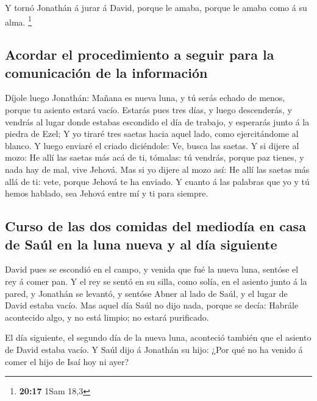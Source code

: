  Y tornó Jonathán á jurar á David, porque le amaba, porque
le amaba como á su alma. \footnote{\textbf{20:17} 1Sam 18,3}

\hypertarget{acordar-el-procedimiento-a-seguir-para-la-comunicaciuxf3n-de-la-informaciuxf3n}{%
\subsection{Acordar el procedimiento a seguir para la comunicación de la
información}\label{acordar-el-procedimiento-a-seguir-para-la-comunicaciuxf3n-de-la-informaciuxf3n}}

 Díjole luego Jonathán: Mañana es nueva luna, y tú serás
echado de menos, porque tu asiento estará vacío.  Estarás
pues tres días, y luego descenderás, y vendrás al lugar donde estabas
escondido el día de trabajo, y esperarás junto á la piedra de Ezel;
 Y yo tiraré tres saetas hacia aquel lado, como
ejercitándome al blanco.  Y luego enviaré el criado
diciéndole: Ve, busca las saetas. Y si dijere al mozo: He allí las
saetas más acá de ti, tómalas: tú vendrás, porque paz tienes, y nada hay
de mal, vive Jehová.  Mas si yo dijere al mozo así: He allí
las saetas más allá de ti: vete, porque Jehová te ha enviado.
 Y cuanto á las palabras que yo y tú hemos hablado, sea
Jehová entre mí y ti para siempre.

\hypertarget{curso-de-las-dos-comidas-del-medioduxeda-en-casa-de-sauxfal-en-la-luna-nueva-y-al-duxeda-siguiente}{%
\subsection{Curso de las dos comidas del mediodía en casa de Saúl en la
luna nueva y al día
siguiente}\label{curso-de-las-dos-comidas-del-medioduxeda-en-casa-de-sauxfal-en-la-luna-nueva-y-al-duxeda-siguiente}}

 David pues se escondió en el campo, y venida que fué la
nueva luna, sentóse el rey á comer pan.  Y el rey se sentó
en su silla, como solía, en el asiento junto á la pared, y Jonathán se
levantó, y sentóse Abner al lado de Saúl, y el lugar de David estaba
vacío.  Mas aquel día Saúl no dijo nada, porque se decía:
Habrále acontecido algo, y no está limpio; no estará purificado.

 El día siguiente, el segundo día de la nueva luna,
aconteció también que el asiento de David estaba vacío. Y Saúl dijo á
Jonathán su hijo: ¿Por qué no ha venido á comer el hijo de Isaí hoy ni
ayer?

